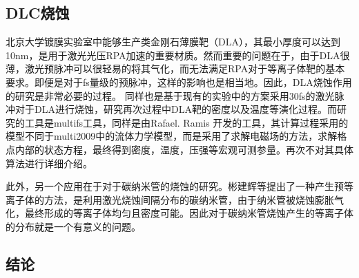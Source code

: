 \subsection{DLC烧蚀}

北京大学镀膜实验室中能够生产类金刚石薄膜靶（DLA），其最小厚度可以达到10nm，是用于激光光压RPA加速的重要材质。然而重要的问题在于，由于DLA很薄，激光预脉冲可以很轻易的将其气化，而无法满足RPA对于等离子体靶的基本要求。即便是对于fs量级的预脉冲，这样的影响也是相当地。因此，DLA烧蚀作用的研究是非常必要的过程。
同样也是基于现有的实验中的方案采用30fs的激光脉冲对于DLA进行烧蚀，研究再次过程中DLA靶的密度以及温度等演化过程。而研究的工具是multifs工具，同样是由Rafael. Ramis 开发的工具，其计算过程采用的模型不同于multi2009中的流体力学模型，而是采用了求解电磁场的方法，求解格点内部的状态方程，最终得到密度，温度，压强等宏观可测参量。再次不对其具体算法进行详细介绍。






此外，另一个应用在于对于碳纳米管的烧蚀的研究。彬建辉等提出了一种产生预等离子体的方法，是利用激光烧蚀间隔分布的碳纳米管，由于纳米管被烧蚀膨胀气化，最终形成的等离子体均匀且密度可能。因此对于碳纳米管烧蚀产生的等离子体的分布就是一个有意义的问题。

\subsection{结论}
